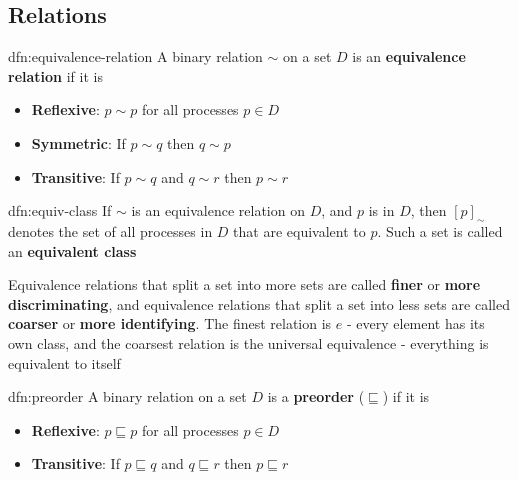 \documentclass{article}
\begin{document}
\newpage

\subsection{Relations}

\begin{dfn}{dfn:equivalence-relation}{}
    A binary relation $\sim$ on a set $D$ is an \textbf{equivalence relation} if it is
    \begin{itemize}
        \item \textbf{Reflexive}: $p \sim p$ for all processes $p\in D$
        \item \textbf{Symmetric}: If $p \sim q$ then $q \sim p$
        \item \textbf{Transitive}: If $p \sim q$ and $q \sim r$ then $p \sim r$
    \end{itemize}
\end{dfn}

\begin{dfn}{dfn:equiv-class}{}
    If $\sim$ is an equivalence relation on $D$, and $p$ is in $D$, then $[p]_{\sim}$ denotes the set of all processes in $D$ that are equivalent to $p$. Such a set is called an \textbf{equivalent class}

    \longrule{0.08ex}

    Equivalence relations that split a set into more sets are called \textbf{finer} or \textbf{more discriminating}, and equivalence relations that split a set into less sets are called \textbf{coarser} or \textbf{more identifying}. The finest relation is $e$ - every element has its own class, and the coarsest relation is the universal equivalence - everything is equivalent to itself
\end{dfn}

\begin{dfn}{dfn:preorder}{}
    A binary relation on a set $D$ is a \textbf{preorder} ($\sqsubseteq$) if it is
    \begin{itemize}
        \item \textbf{Reflexive}: $p \sqsubseteq p$ for all processes $p\in D$
        \item \textbf{Transitive}: If $p \sqsubseteq q$ and $q \sqsubseteq r$ then $p \sqsubseteq r$
    \end{itemize}
\end{dfn}
\end{document}
